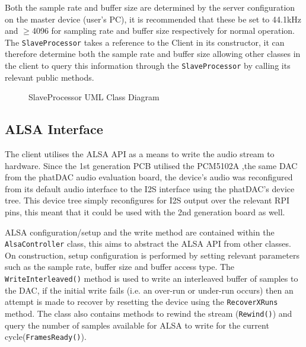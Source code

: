 \documentclass[main.tex]{subfiles}
\begin{document}
Both the sample rate and buffer size are determined by the server configuration on the master device (user's PC), it is recommended that these be set to 44.1kHz and $\geq$4096 for sampling rate and buffer size respectively for normal operation.
The \lstinline{SlaveProcessor} takes a reference to the Client in its constructor, it can therefore determine both the sample rate and buffer size allowing other classes in the client to query this information through the \lstinline{SlaveProcessor} by calling its relevant public methods.

\begin{figure}[H]
    \centering
    \caption{SlaveProcessor UML Class Diagram}
    \label{fig:alsa-uml}
\end{figure}

\subsection{ALSA Interface}
The client utilises the ALSA API as a means to write the audio stream to hardware.
Since the 1st generation PCB utilised the PCM5102A ,the same DAC from the phatDAC audio evaluation board, the device's audio was reconfigured from its default audio interface to the I2S interface using the phatDAC's device tree\cite{phatDAC-tree}.
This device tree simply reconfigures for I2S output over the relevant RPI pins, this meant that it could be used with the 2nd generation board as well.

\medskip
ALSA configuration/setup and the write method are contained within the \lstinline{AlsaController} class, this aims to abstract the ALSA API from other classes.
On construction, setup configuration is performed by setting relevant parameters such as the sample rate, buffer size and buffer access type.
The \lstinline{WriteInterleaved()} method is used to write an interleaved buffer of samples to the DAC, if the initial write fails (i.e. an over-run or under-run occurs) then an attempt is made to recover by resetting the device using the \lstinline{RecoverXRuns} method.
The class also contains methods to rewind the stream (\lstinline{Rewind()}) and query the number of samples available for ALSA to write for the current cycle(\lstinline{FramesReady()}).
\end{document}
